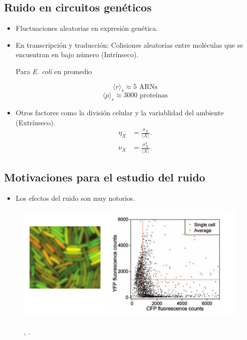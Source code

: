 \documentclass[xcolor=dvipsnames]{beamer}
\begin{document}
\subsection{Ruido en circuitos gen\'eticos}
\begin{frame}
\begin{itemize}
\item Fluctuaciones aleatorias en expresi\'on gen\'etica.
\item En transcripci\'on y traducci\'on: Colisiones aleatorias entre mol\'eculas que se encuentran en bajo n\'umero (Intr\'inseco).

Para \textit{E. coli} en promedio

$$\langle r\rangle_s \approx 5 \text{ ARNs}$$
$$\langle p\rangle_s \approx 3000 \text{ prote\'inas}$$

\item Otros factores como la divisi\'on celular y la variablidad del ambiente (Extr\'inseco).
\begin{align*}
\eta_X &= \frac{\sigma_X}{\langle X \rangle}.\\[1.5ex]
\nu_X &= \frac{\sigma^2_X}{\langle X \rangle}.
\end{align*}
\end{itemize}
\end{frame}

\subsection{Motivaciones para el estudio del ruido}
\begin{frame}

\begin{itemize}
\item Los efectos del ruido son muy notorios.
\end{itemize}

\begin{figure}[p]
    \centering
    \includegraphics[width=.7\textwidth]{int-noise1}~\\
    \tiny \cite{elowitz02}, \cite{pedraza05}.
\end{figure}
\end{frame}
\end{document}
